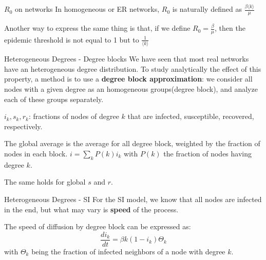\begin{textbox}{$R_0$ on networks}
    In homogeneous or ER networks, $R_0$ is naturally defined as $\frac{\beta \langle k \rangle}{\mu}$

    Another way to express the same thing is that, if we define $R_0=\frac{\beta}{\mu}$, then the epidemic threshold is not equal to 1 but to $\frac{1}{\langle k \rangle}$
\end{textbox}


\begin{textbox}{Heterogeneous Degrees - Degree blocks}
    We have seen that most real networks have an heterogeneous degree distribution. To study analytically the effect of this property, a method is to use a \textbf{degree block approximation}: we consider all nodes with a given degree as an homogeneous groups(degree block), and analyze each of these groups separately.

    $i_k,s_k,r_k$: fractions of nodes of degree $k$ that are infected, susceptible, recovered, respectively.

    The global average is the average for all degree block, weighted by the fraction of nodes in each block.
    $i=\sum_k P(k)i_k$
    with $P(k)$ the fraction of nodes having degree $k$.

    The same holds for global $s$ and $r$.
\end{textbox}


\begin{textbox}{Heterogeneous Degrees - SI}
    For the SI model, we know that all nodes are infected in the end, but what may vary is \textbf{speed} of the process.

    The speed of diffusion by degree block can be expressed as:
    \[
        \frac{di_k}{dt}= \beta k(1-i_k) \Theta_k
    \]
    with $\Theta_k$ being the fraction of infected neighbors of a node with degree $k$.
\end{textbox}


